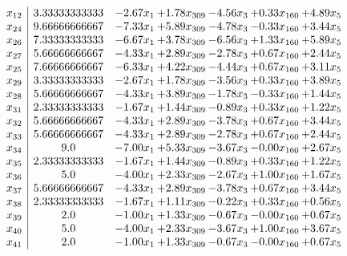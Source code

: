 \documentclass[8pt]{article}
\begin{document}
\[\begin{array}{c| c c@{\hskip 2pt} c@{\hskip 2pt} c@{\hskip 2pt} c@{\hskip 2pt} c@{\hskip 2pt} }
 x_{12}   &  3.33333333333 & -2.67 x_{1} & +  1.78 x_{309} & -4.56 x_{3} & +  0.33 x_{160} & +  4.89 x_{5}\\
 x_{24}   &  9.66666666667 & -7.33 x_{1} & +  5.89 x_{309} & -4.78 x_{3} & -0.33 x_{160} & +  3.44 x_{5}\\
 x_{26}   &  7.33333333333 & -6.67 x_{1} & +  3.78 x_{309} & -6.56 x_{3} & +  1.33 x_{160} & +  5.89 x_{5}\\
 x_{27}   &  5.66666666667 & -4.33 x_{1} & +  2.89 x_{309} & -2.78 x_{3} & +  0.67 x_{160} & +  2.44 x_{5}\\
 x_{25}   &  7.66666666667 & -6.33 x_{1} & +  4.22 x_{309} & -4.44 x_{3} & +  0.67 x_{160} & +  3.11 x_{5}\\
 x_{29}   &  3.33333333333 & -2.67 x_{1} & +  1.78 x_{309} & -3.56 x_{3} & +  0.33 x_{160} & +  3.89 x_{5}\\
 x_{28}   &  5.66666666667 & -4.33 x_{1} & +  3.89 x_{309} & -1.78 x_{3} & -0.33 x_{160} & +  1.44 x_{5}\\
 x_{31}   &  2.33333333333 & -1.67 x_{1} & +  1.44 x_{309} & -0.89 x_{3} & +  0.33 x_{160} & +  1.22 x_{5}\\
 x_{32}   &  5.66666666667 & -4.33 x_{1} & +  2.89 x_{309} & -3.78 x_{3} & +  0.67 x_{160} & +  3.44 x_{5}\\
 x_{33}   &  5.66666666667 & -4.33 x_{1} & +  2.89 x_{309} & -2.78 x_{3} & +  0.67 x_{160} & +  2.44 x_{5}\\
 x_{34}   &  9.0 & -7.00 x_{1} & +  5.33 x_{309} & -3.67 x_{3} & -0.00 x_{160} & +  2.67 x_{5}\\
 x_{35}   &  2.33333333333 & -1.67 x_{1} & +  1.44 x_{309} & -0.89 x_{3} & +  0.33 x_{160} & +  1.22 x_{5}\\
 x_{36}   &  5.0 & -4.00 x_{1} & +  2.33 x_{309} & -2.67 x_{3} & +  1.00 x_{160} & +  1.67 x_{5}\\
 x_{37}   &  5.66666666667 & -4.33 x_{1} & +  2.89 x_{309} & -3.78 x_{3} & +  0.67 x_{160} & +  3.44 x_{5}\\
 x_{38}   &  2.33333333333 & -1.67 x_{1} & +  1.11 x_{309} & -0.22 x_{3} & +  0.33 x_{160} & +  0.56 x_{5}\\
 x_{39}   &  2.0 & -1.00 x_{1} & +  1.33 x_{309} & -0.67 x_{3} & -0.00 x_{160} & +  0.67 x_{5}\\
 x_{40}   &  5.0 & -4.00 x_{1} & +  2.33 x_{309} & -3.67 x_{3} & +  1.00 x_{160} & +  3.67 x_{5}\\
 x_{41}   &  2.0 & -1.00 x_{1} & +  1.33 x_{309} & -0.67 x_{3} & -0.00 x_{160} & +  0.67 x_{5}\\

\end{array}\]
\end{document}
